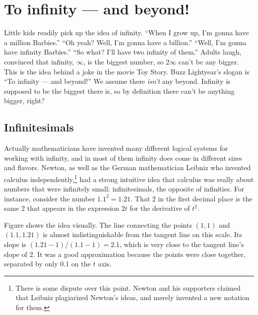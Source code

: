 \chapter{To infinity --- and beyond!}\label{ch:infinity}

Little kids readily pick up the idea of infinity.
``When I grow up, I'm
gonna have a million Barbies.'' ``Oh yeah? Well, I'm gonna have a billion.''
``Well, I'm gonna have infinity Barbies.'' ``So what? I'll have two infinity of them.''
Adults laugh, convinced that infinity, $\infty$, is the biggest number, so $2\infty$
can't be any bigger. This is the idea behind a joke in the movie Toy Story. Buzz
Lightyear's slogan is ``To infinity --- and beyond!'' We assume there \emph{isn't}
any beyond. Infinity is supposed to be the biggest there is, so by definition there
can't be anything bigger, right?

\section{Infinitesimals}

%
Actually mathematicians have invented many different logical systems for working
with infinity, and in most of them infinity does come in different sizes and flavors.
Newton, as well as the German mathematician Leibniz
who invented calculus independently,\footnote{There is
some dispute over this point. Newton and his supporters claimed that Leibniz plagiarized Newton's
ideas, and merely invented a new notation for them.}
had a strong intuitive idea that calculus was really about numbers that were infinitely
small: infinitesimals, the opposite of infinities. For instance, consider
the number $1.1^2=1.21$. That 2 in the first decimal place is the same 2 that
appears in the expression $2t$ for the derivative of $t^2$.


Figure   shows the idea visually. The line connecting the points $(1,1)$ and $(1.1,1.21)$ is almost
indistinguishable from the tangent line on this scale. Its slope is $(1.21-1)/(1.1-1)=2.1$, which is very close to the
tangent line's slope of 2. It was a good approximation because the points were close together, separated by only
0.1 on the $t$ axis.

